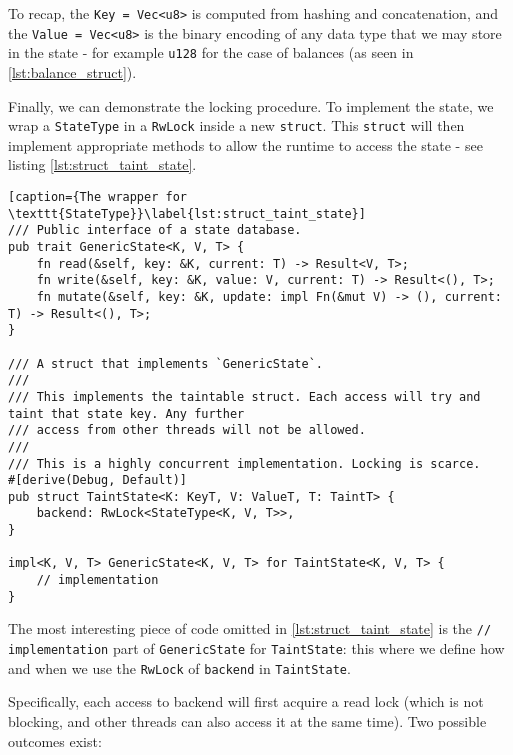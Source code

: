 To recap, the \texttt{Key = Vec<u8>} is computed from hashing and concatenation, and the
\texttt{Value = Vec<u8>} is the binary encoding of any data type that we may store in the state -
for example \texttt{u128} for the case of balances (as seen in \ref{lst:balance_struct}).

Finally, we can demonstrate the locking procedure. To implement the state, we wrap a
\texttt{StateType} in a \texttt{RwLock} inside a new \texttt{struct}. This \texttt{struct} will then
implement appropriate methods to allow the runtime to access the state - see listing
\ref{lst:struct_taint_state}.

\begin{lstlisting}[caption={The wrapper for \texttt{StateType}}\label{lst:struct_taint_state}]
/// Public interface of a state database.
pub trait GenericState<K, V, T> {
	fn read(&self, key: &K, current: T) -> Result<V, T>;
	fn write(&self, key: &K, value: V, current: T) -> Result<(), T>;
	fn mutate(&self, key: &K, update: impl Fn(&mut V) -> (), current: T) -> Result<(), T>;
}

/// A struct that implements `GenericState`.
///
/// This implements the taintable struct. Each access will try and taint that state key. Any further
/// access from other threads will not be allowed.
///
/// This is a highly concurrent implementation. Locking is scarce.
#[derive(Debug, Default)]
pub struct TaintState<K: KeyT, V: ValueT, T: TaintT> {
	backend: RwLock<StateType<K, V, T>>,
}

impl<K, V, T> GenericState<K, V, T> for TaintState<K, V, T> {
	// implementation
}
\end{lstlisting}

The most interesting piece of code omitted in \ref{lst:struct_taint_state} is the \texttt{//
implementation} part of \texttt{GenericState} for \texttt{TaintState}: this where we define how and
when we use the \texttt{RwLock} of \texttt{backend} in \texttt{TaintState}.

Specifically, each access to backend will first acquire a read lock (which is not blocking, and
other threads can also access it at the same time). Two possible outcomes exist:

